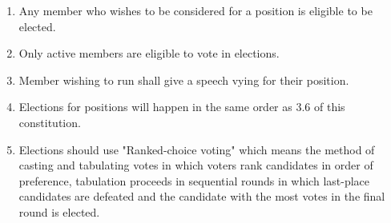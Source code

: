
\begin{enumerate}
	\item Any member who wishes to be considered for a position is eligible to be elected.
	\item Only active members are eligible to vote in elections.
    \item Member wishing to run shall give a speech vying for their position.
    \item Elections for positions will happen in the same order as 3.6 of this constitution.
    \item Elections should use "Ranked-choice voting" which means the method of casting and tabulating votes in which voters rank candidates in order of preference, tabulation proceeds in sequential rounds in which last-place candidates are defeated and the candidate with the most votes in the final round is elected.
\end{enumerate}
